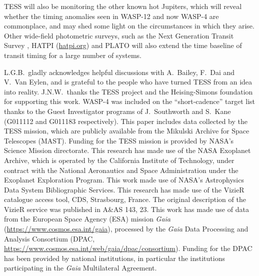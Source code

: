 \documentclass[12pt,twocolumn,tighten]{aastex62}
\begin{document}
TESS will also be monitoring the other known hot Jupiters, which will
reveal whether the timing anomalies seen in WASP-12 and now WASP-4 are
commonplace, and may shed some light on the circumstances in which
they arise. Other wide-field photometric surveys, such as the Next
Generation Transit Survey \citep{wheatley_next_2018}, HATPI
(\href{https://hatpi.org}{hatpi.org}) and
PLATO \citep{rauer_plato_2014} will also extend
the time baseline of transit timing for a large number of systems.

\acknowledgements
L.G.B.\ gladly acknowledges helpful discussions with
A.~Bailey, F.~Dai and V.~Van Eylen, and is grateful to the
people who have turned TESS from an idea into reality.
%
J.N.W.\ thanks the TESS project and the Heising-Simons foundation for
supporting this work.
%
WASP-4 was included on the ``short-cadence'' target list thanks to the
Guest Investigator programs of J.\ Southworth and S.\ Kane (G011112
and G011183 respectively). 
%
This paper includes data collected by the TESS mission, which are
publicly available from the Mikulski Archive for Space Telescopes
(MAST).
%
Funding for the TESS mission is provided by NASA's Science Mission
directorate.
%
This research has made use of the NASA Exoplanet Archive, which is
operated by the California Institute of Technology, under contract
with the National Aeronautics and Space Administration under the
Exoplanet Exploration Program.
%
This work made use of NASA's Astrophysics Data System Bibliographic
Services.
%
This research has made use of the VizieR catalogue access tool, CDS,
Strasbourg, France. The original description of the VizieR service was
published in A\&AS 143, 23.
%
This work has made use of data from the European Space Agency (ESA)
mission {\it Gaia} (\url{https://www.cosmos.esa.int/gaia}), processed
by the {\it Gaia} Data Processing and Analysis Consortium (DPAC,
\url{https://www.cosmos.esa.int/web/gaia/dpac/consortium}). Funding
for the DPAC has been provided by national institutions, in particular
the institutions participating in the {\it Gaia} Multilateral
Agreement.
%
\newline
%
%
\end{document}

